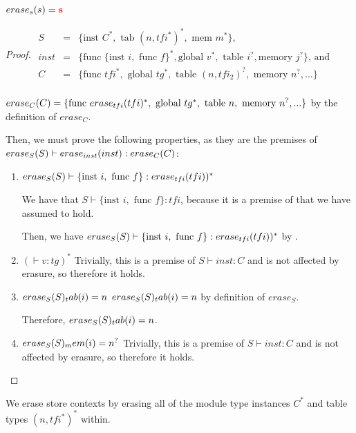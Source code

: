 \begin{definition}{$\erase[s]{s} = \mathredbold{s}$}
\begin{proof}
    \begin{math}
        \begin{array}{rcl}
            S &=& \{\text{inst } C^{*}, \text{ tab } (n,tfi^{*})^{*}, \text{ mem } m^{*}\} \text{,} \\
            inst &=& \{\text{func } \{\text{inst } i, \text{ func } f\}^{*}, \text{global } v^{*}, \text{ table } i^{?}, \text{memory } j^{?}\} \text{, and} \\
            C &=& \{\text{func } tfi^{*}, \text{ global } tg^{*}, \text{ table } (n,tfi_2)^{?}, \text{ memory } n^{?}, \dots\} \\
        \end{array}
    \end{math}

    $\erase[C]{C}=\{\text{func } \erase[tfi]{tfi}^{*}, \text{ global } tg^{*}, \text{ table } n, \text{ memory } n^{?}, ...\}$ by the definition of $erase_C$.

    Then, we must prove the following properties, as they are the premises of $\erase[S]{S} \vdash \erase[inst]{inst} : \erase[C]{C}$:
    \begin{enumerate}
        \item $\erase[S]{S} \vdash \{\text{inst } i, \text{ func } f\} : \erase[tfi]{tfi})^{*}$

        We have that $S \vdash \{\text{inst } i, \text{ func } f\} : tfi$, because it is a premise of  that we have assumed to hold.

        Then, we have $\erase[S]{S} \vdash \{\text{inst } i, \text{ func } f\} : \erase[tfi]{tfi})^{*}$ by .

        \item $(\vdash v : tg)^{*}$
        Trivially, this is a premise of $S \vdash inst : C$ and is not affected by erasure, so therefore it holds.

        \item $\erase[S]{S}_tab(i)=n$
        $\erase[S]{S}_tab(i)=n$ by definition of $erase_S$.

        Therefore, $\erase[S]{S}_tab(i)=n$.

        \item $\erase[S]{S}_mem(i)=n^{?}$
        Trivially, this is a premise of $S \vdash inst : C$ and is not affected by erasure, so therefore it holds.
    \end{enumerate}
\end{proof}

We erase store contexts by erasing all of the module type instances $C^{*}$ and table types $(n,tfi^{*})^{*}$ within.


\end{definition}
